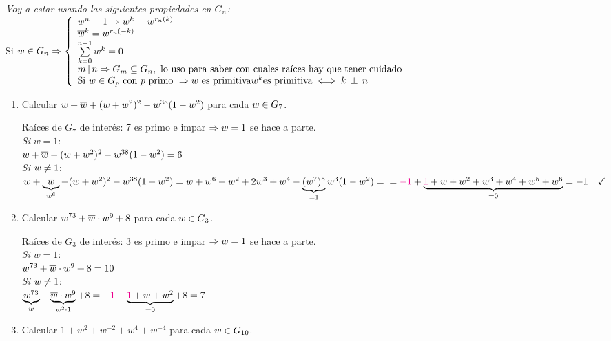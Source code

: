 \ejercicio
\textit{Voy a estar usando las siguientes propiedades en $G_n$: }\\
Si $w \en G_n \entonces
	\llave{l}{
		w^n = 1 \entonces w^k = w^{r_n(k)}\\
		\conj w^k = w^{r_n(-k)} \\
		\sumatoria{k=0}{n-1}w^k = 0\\
		m \divideA n \entonces G_m \subseteq G_n,\text{ lo uso para saber con cuales raíces hay que tener cuidado}\\
		\text{Si } w \en G_p \text{ con $p$ primo } \entonces w \text{ es primitiva}
		w^k \text{es primitiva} \sisolosi k \cop n
	}$\\

\begin{enumerate}[label=\roman*)]
	\item Calcular $w + \conj w + (w + w^2)^2 - w^{38}(1 - w^2)$ para cada $w \en G_7$.

	      \separadorCorto
	      Raíces de $G_7$ de interés: 7 es primo e impar $\entonces w = 1$ se hace a parte.\\
	      \textit{Si} $w = 1$: \\
	      $w + \conj w + (w + w^2)^2 - w^{38}(1 - w^2) = 6$\\

	      \textit{Si} $w \distinto 1$: \\
	      $w + \ub{\conj w}{w^6} + (w + w^2)^2 - w^{38}(1 - w^2) =
		      w + w^6 + w^2 + 2w^3 + w^4 - \ub{(w^7)^5}{=1} w^3(1 - w^2) =\\
		      =  \magenta{-1} + \ub{\magenta{1} + w + w^2 + w^3 + w^4 + w^5 + w^6}{=0} = -1 \Tilde$

	\item Calcular $w^{73} + \conj w \cdot w^9 + 8$ para cada $w\en G_3$.

	      \separadorCorto
	      Raíces de $G_3$ de interés: 3 es primo e impar $\entonces w = 1$ se hace a parte.\\
	      \textit{Si} $w = 1$: \\
	      $w^{73} + \conj w \cdot w^9 + 8 = 10 $\\

	      \textit{Si} $w \distinto 1$: \\
	      $\ub{w^{73}}{w} + \ub{\conj w \cdot w^9 }{w^2 \cdot 1}+ 8 =
		      \magenta{-1} + \ub{\magenta{1} + w + w^2}{= 0} + 8 = 7 $

	\item Calcular $1 + w^2 + w^{-2} + w^4 + w^{-4}$ para cada $w\en G_{10}$.


\end{enumerate}
